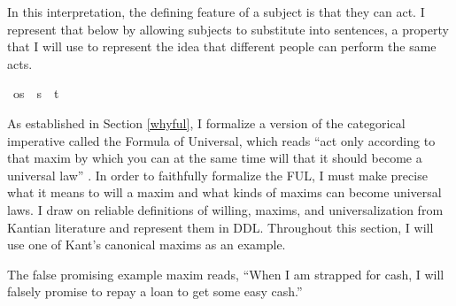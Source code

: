 \begin{isabellebody}
\begin{isamarkuptext}
In this interpretation, the defining feature of a subject is that they can act. 
I represent that below by allowing subjects to substitute into sentences, a property that I will use 
to represent the idea that different people can perform the same acts.%
\end{isamarkuptext}\isamarkuptrue%
\isamarkupfalse%
\ os\ {\isacharequal}\ {\isachardoublequoteopen}{\isacharparenleft}s\ {\isasymRightarrow}\ t{\isacharparenright}{\isachardoublequoteclose}\ \isanewline
%
%
\isadelimdocument
%
\endisadelimdocument
%
\isatagdocument
%
\isamarkuptrue%
%
\endisatagdocument
{\isafolddocument}%
%
\isadelimdocument
%
\endisadelimdocument
%
\begin{isamarkuptext}%
As established in Section \ref{whyful}, I formalize a version of the categorical imperative called
the Formula of Universal, which reads ``act only according to that maxim by which you can at the same 
time will that it should become a universal law'' \citep[34]{groundwork}. In order to faithfully formalize
the FUL, I must make precise what it means to will a maxim and what kinds of maxims can become universal laws. 
I draw on reliable definitions of willing, maxims, and universalization from Kantian literature and represent them in DDL.
Throughout this section, I will use one of Kant's canonical maxims as an example.

\begin{example}\label{falsepromise}
  The false promising example maxim reads, ``When I am strapped for cash, I will falsely promise to repay a loan 
to get some easy cash.''
\end{example}


\end{isamarkuptext}
\end{isabellebody}
